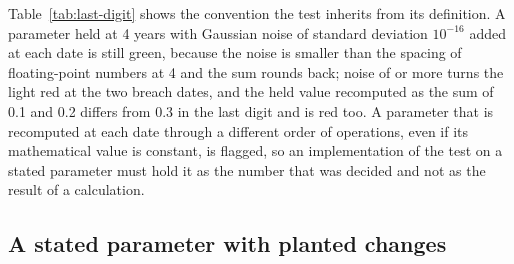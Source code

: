 

Table~\ref{tab:last-digit} shows the convention the test inherits from its definition. A parameter held at 4 years with Gaussian noise of standard deviation $10^{-16}$ added at each date is still green, because the noise is smaller than the spacing of floating-point numbers at 4 and the sum rounds back; noise of \noiseFirstRed{} or more turns the light red at the two breach dates, and the held value recomputed as the sum of 0.1 and 0.2 differs from 0.3 in the last digit and is red too. A parameter that is recomputed at each date through a different order of operations, even if its mathematical value is constant, is flagged, so an implementation of the test on a stated parameter must hold it as the number that was decided and not as the result of a calculation.



\subsection{A stated parameter with planted changes}
\label{sec:res-stated}

